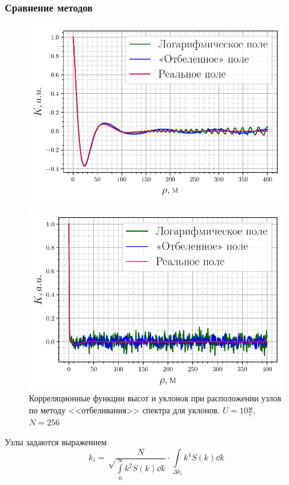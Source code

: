 \documentclass[10pt,pdf,hyperref={unicode}, dvipsnames]{beamer}
\begin{document}
\begin{frame}[t]
\end{frame}


\begin{frame}[plain]
	
	\frametitle{Сравнение методов}

   \begin{figure}[h!]
	\begin{minipage}{0.49\linewidth}
			\centering
			\includegraphics[width=\linewidth]{fig/correlation_height_wa.pdf}
			\label{fig:ch21}		
	\end{minipage}
	\hfill
	\begin{minipage}{0.49\linewidth}
			\centering
			\includegraphics[width=\linewidth]{fig/correlation_angles_wa.pdf}
	\end{minipage}
	\caption{Корреляционные функции высот и уклонов при расположении узлов по методу <<отбеливания>> спектра для уклонов. $U=10 \frac{\text{м}}{\text{c}}$, $N=256$}
			\label{fig:ca21}		
\end{figure}

	Узлы задаются выражением
	\begin{equation}
	k_i=\sqrt\frac{N}{{\int\limits_{0}^{\infty} k^2 S(k) \dd{k}}}\cdot {\int\limits_{\Delta k_i} k^4 S(k) \dd{k}}
	\end{equation}



\end{frame}
\end{document}
